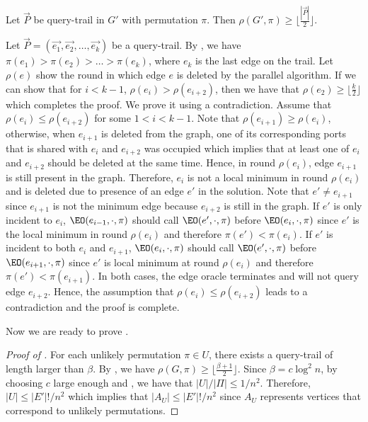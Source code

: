 \begin{claim}\label{clm: large-round-complexity}
Let $\vec{P}$ be query-trail in $G'$ with permutation $\pi$. Then $\rho(G', \pi) \geq \lfloor \frac{|\vec{P}|}{2}\rfloor$.
\end{claim}
\begin{myproof}
Let $\vec{P} = (\vec{e_1}, \vec{e_2}, \ldots, \vec{e_k})$ be a query-trail. By , we have $\pi(e_1) > \pi(e_2) > \ldots > \pi(e_k)$, where $e_k$ is the last edge on the trail. Let $\rho(e)$ show the round in which edge $e$ is deleted by the parallel algorithm. If we can show that for $i < k - 1$, $\rho(e_i) > \rho(e_{i+2})$, then we have that $\rho(e_2) \geq \lfloor \frac{k}{2}\rfloor$ which completes the proof. We prove it using a contradiction. Assume that $\rho(e_i) \leq \rho(e_{i+2})$ for some $1 < i < k - 1$. Note that $\rho(e_{i+1}) \geq \rho(e_i)$, otherwise, when $e_{i+1}$ is deleted from the graph, one of its corresponding ports that is shared with $e_i$ and $e_{i+2}$ was occupied which implies that at least one of $e_i$ and $e_{i+2}$ should be deleted at the same time. Hence, in round $\rho(e_i)$, edge $e_{i+1}$ is still present in the graph. Therefore, $e_i$ is not a local minimum in round $\rho(e_i)$ and is deleted due to presence of an edge $e'$ in the solution. Note that $e' \neq e_{i+1}$ since $e_{i+1}$ is not the minimum edge because $e_{i+2}$ is still in the graph. If $e'$ is only incident to $e_i$, $\EO(e_{i-1}, \cdot, \pi)$ should call $\EO(e', \cdot, \pi)$ before $\EO(e_i, \cdot, \pi)$ since $e'$ is the local minimum in round $\rho(e_i)$ and therefore $\pi(e') < \pi(e_i)$. If $e'$ is incident to both $e_i$ and $e_{i+1}$, $\EO(e_i, \cdot, \pi)$ should call $\EO(e', \cdot,\pi)$ before $\EO(e_{i+1}, \cdot,\pi)$ since $e'$ is local minimum at round $\rho(e_i)$ and therefore $\pi(e') < \pi(e_{i+1})$. In both cases, the edge oracle terminates and will not query edge $e_{i+2}$. Hence, the assumption that $\rho(e_i) \leq \rho(e_{i+2})$ leads to a contradiction and the proof is complete.
\end{myproof}

Now we are ready to prove .

\begin{proof}[Proof of ]
For each unlikely permutation $\pi \in U$, there exists a query-trail of length larger than $\beta$. By , we have $\rho(G, \pi) \geq \lfloor \frac{\beta + 1}{2}\rfloor$. Since $\beta = c\log^2 n$, by choosing $c$ large enough and , we have that $|U|/|\Pi| \leq 1/n^2$. Therefore, $|U| \leq |E'|!/n^2$ which implies that $|A_U| \leq |E'|!/n^2$ since $A_U$ represents vertices that correspond to unlikely permutations.
\end{proof}


